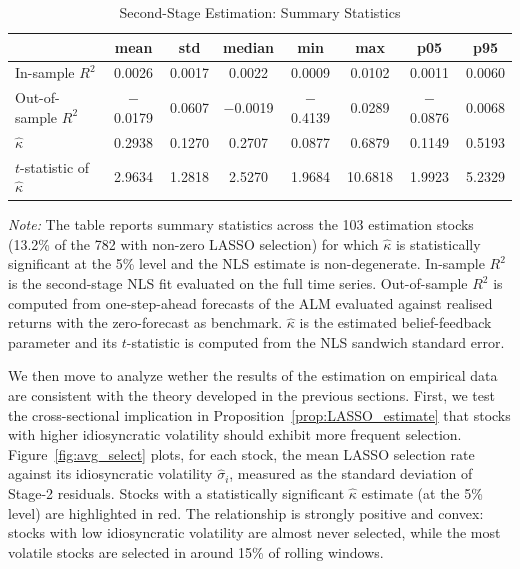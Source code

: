 \begin{table}[H]
\centering
\caption{Second-Stage Estimation: Summary Statistics}
\label{tab:summary_stats_stage2}
\begin{tabularx}{\textwidth}{@{}>{\small}Xccccccc@{}}
\toprule
 & mean & std & median & min & max & p05 & p95 \\
\midrule
In-sample $R^2$        & 0.0026 & 0.0017 & 0.0022 & 0.0009 & 0.0102 & 0.0011 & 0.0060 \\
Out-of-sample $R^2$    & $-$0.0179 & 0.0607 & $-$0.0019 & $-$0.4139 & 0.0289 & $-$0.0876 & 0.0068 \\
$\hat{\kappa}$         & 0.2938 & 0.1270 & 0.2707 & 0.0877 & 0.6879 & 0.1149 & 0.5193 \\
$t$-statistic of $\hat{\kappa}$ & 2.9634 & 1.2818 & 2.5270 & 1.9684 & 10.6818 & 1.9923 & 5.2329 \\
\bottomrule
\end{tabularx}
\medskip
\begin{minipage}{\textwidth}
\footnotesize
\textit{Note:} The table reports summary statistics across the 103 estimation stocks (13.2\% of the 782 with non-zero LASSO selection) for which $\hat\kappa$ is statistically significant at the 5\% level and the NLS estimate is non-degenerate.
In-sample $R^2$ is the second-stage NLS fit evaluated on the full time series.
Out-of-sample $R^2$ is computed from one-step-ahead forecasts of the ALM evaluated against realised returns with the zero-forecast as benchmark.
$\hat{\kappa}$ is the estimated belief-feedback parameter and its $t$-statistic is computed from the NLS sandwich standard error.
\end{minipage}
\end{table}

We then move to analyze wether the results of the estimation on empirical data are consistent with the theory developed in the previous sections.
First, we test the cross-sectional implication in Proposition~\ref{prop:LASSO_estimate} that stocks with higher idiosyncratic volatility should exhibit more frequent selection.
Figure~\ref{fig:avg_select} plots, for each stock, the mean LASSO selection rate against its idiosyncratic volatility $\hat{\sigma}_i$, measured as the standard deviation of Stage-2 residuals.
Stocks with a statistically significant $\hat{\kappa}$ estimate (at the 5\% level) are highlighted in red.
The relationship is strongly positive and convex: stocks with low idiosyncratic volatility are almost never selected, while the most volatile stocks are selected in around 15\% of rolling windows.

